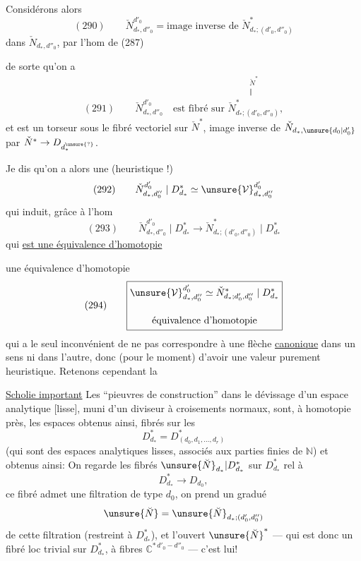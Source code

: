 Considérons alors
\[
(290)\qquad\check N^{d'_0}_{d_*,d''_0}=\text{image inverse de }\check N^*_{d_*;(d'_0,d''_0)}
\]
dans $\check N_{d_*,d''_0}$, par l'hom
de (287)

de sorte qu'on a
\[
(291)\qquad\check N^{d'_0}_{d_*,d''_0}\quad\text{est fibré sur }\overset{\substack{\check N^*\\\Vert}}{\check N^*_{d_*;(d'_0,d''_0)}},
\]
et est un torseur sous le fibré vectoriel sur $\check N^*$, image inverse de $\check N_{d_*,\unsure{d_0|d'_0}}$ par $\check N^*\to D_{d^{\unsure{?}}_*}$.

Je dis qu'on a alors une  (heuristique !)
\[
(292)\qquad\check N^{d'_0}_{d_*,d''_0}\mid D^*_{d_*}\simeq\unsure{\mathcal V}^{d'_0}_{d_*,d''_0}
\]
qui induit, grâce à l'hom
\[
(293)\qquad\check N^{d'_0}_{d_*,d''_0}\mid D^*_{d_*}\longrightarrow\check N^*_{d_*;(d'_0,d''_0)}\mid D^*_{d_*}
\]
qui \uline{est une équivalence d'homotopie}

une équivalence d'homotopie
\[
(294)\qquad\boxed{\begin{gathered}
\unsure{\mathcal V}^{d'_0}_{d_*,d''_0}\simeq\check N^*_{d_*;d'_0,d''_0}\mid D^*_{d_*}\\[1em]
\text{équivalence d'homotopie}
\end{gathered}}
\]
qui a le seul inconvénient de ne pas correspondre à une flèche \uline{canonique} dans un sens ni dans l'autre, donc (pour le moment) d'avoir une valeur purement heuristique. Retenons cependant la


\uline{Scholie important} Les ``pieuvres de construction'' dans le dévissage d'un espace analytique [lisse], muni d'un diviseur à croisements normaux, sont,  à homotopie près, les espaces obtenus ainsi, fibrés sur les
\[
D_{d_*}^{*}=D_{(d_0,d_1,\ldots,d_r)}^{*}
\]
(qui sont des espaces analytiques lisses,  associés aux parties finies  de $\mathbb N$) et obtenus ainsi: On regarde les fibrés  $\unsure{\breve N}_{d_*}|D_{d_*}^{*}$ sur $D_{d_*}^{*}$ rel à
\[
D_{d_*}^{*}\longrightarrow D_{d_0},
\]
ce fibré  admet une filtration de type $d_0$, on prend un  gradué
\[
\unsure{\breve N}=\unsure{\breve N}_{d_*;(d'_0,d''_0)}
\]
de cette filtration  (restreint à $D_{d_*}^{*}$), et l'ouvert $\unsure{\breve N}^{*}$ --- qui est donc un fibré loc trivial sur $D_{d_*}^{*}$, à fibres $\mathbb C^{*\,d'_0-d''_0}$ --- c'est lui!

